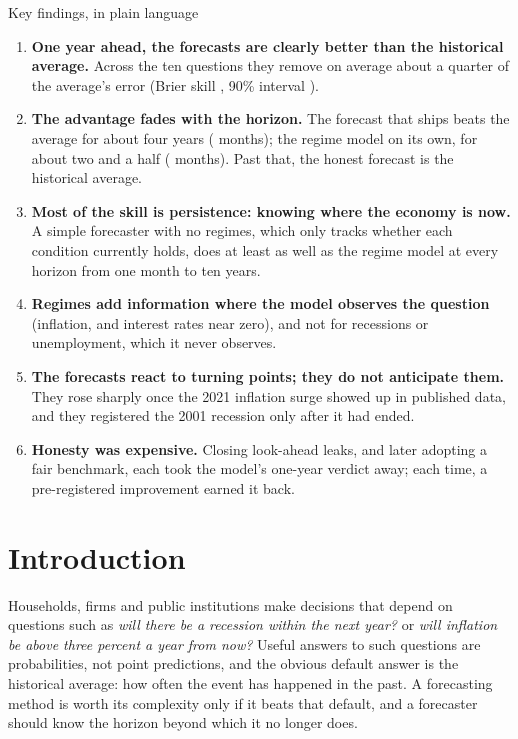 \documentclass[11pt]{article}
\begin{document}
\begin{keybox}{Key findings, in plain language}
\begin{enumerate}[leftmargin=*]
\item \textbf{One year ahead, the forecasts are clearly better than the historical average.} Across the ten
  questions they remove on average about a quarter of the average's error (Brier skill
  \BlendSkillOneYear, 90\% interval \BlendIntervalOneYear).
\item \textbf{The advantage fades with the horizon.} The forecast that ships beats the average for about
  four years (\BlendHorizon{} months); the regime model on its own, for about two and a half
  (\ModelHorizon{} months). Past that, the honest forecast is the historical average.
\item \textbf{Most of the skill is persistence: knowing where the economy is now.} A simple forecaster
  with no regimes, which only tracks whether each condition currently holds, does at least as well as the
  regime model at every horizon from one month to ten years.
\item \textbf{Regimes add information where the model observes the question} (inflation, and interest
  rates near zero), and not for recessions or unemployment, which it never observes.
\item \textbf{The forecasts react to turning points; they do not anticipate them.} They rose sharply once
  the 2021 inflation surge showed up in published data, and they registered the 2001 recession only
  after it had ended.
\item \textbf{Honesty was expensive.} Closing look-ahead leaks, and later adopting a fair benchmark, each
  took the model's one-year verdict away; each time, a pre-registered improvement earned it back.
\end{enumerate}
\end{keybox}

\section{Introduction}\label{sec:introduction}

Households, firms and public institutions make decisions that depend on questions such as \emph{will
there be a recession within the next year?} or \emph{will inflation be above three percent a year from
now?} Useful answers to such questions are probabilities, not point predictions, and the obvious default
answer is the historical average: how often the event has happened in the past. A forecasting method is
worth its complexity only if it beats that default, and a forecaster should know the horizon beyond
which it no longer does.
\end{document}
